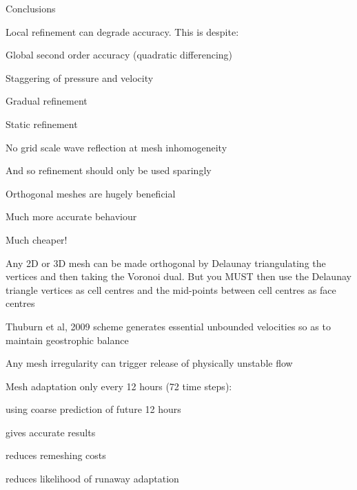 \begin{slide}{Conclusions}

\begin{list0}

\item Local refinement can degrade accuracy. This is despite:
    \begin{list1}
    \item Global second order accuracy (quadratic differencing)
    \item Staggering of pressure and velocity
    \item Gradual refinement
    \item Static refinement
    \item No grid scale wave reflection at mesh inhomogeneity
    \end{list1}
And so refinement should only be used sparingly

\item Orthogonal meshes are hugely beneficial
    \begin{list1}
    \item Much more accurate behaviour
    \item Much cheaper!
    \end{list1}

\item Any 2D or 3D mesh can be made orthogonal by Delaunay triangulating the vertices and then taking the Voronoi dual. But you MUST then use the Delaunay triangle vertices as cell centres and the mid-points between cell centres as face centres

\item Thuburn et al, 2009 scheme generates essential unbounded velocities so as to maintain geostrophic balance

\item Any mesh irregularity can trigger release of physically unstable flow

\item Mesh adaptation only every 12 hours (72 time steps):

\begin{list1}
\item using coarse prediction of future 12 hours
\item gives accurate results
\item reduces remeshing costs
\item reduces likelihood of runaway adaptation
\end{list1}
\end{list0}

\end{slide}
